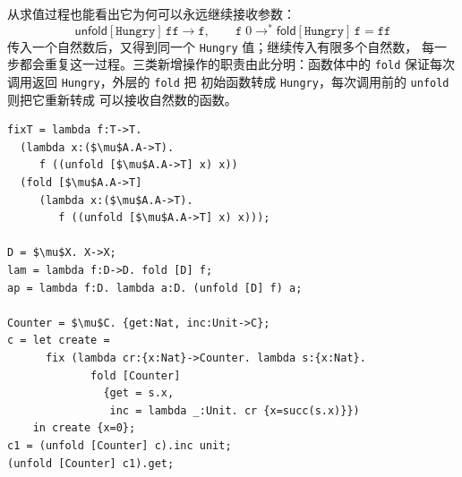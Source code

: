 \begin{taplauthorsolutionentrybox}
{从求值过程也能看出它为何可以永远继续接收参数：
\[
\mathsf{unfold}[\texttt{Hungry}]\,\texttt{ff}
\longrightarrow \texttt{f},
\qquad
\texttt{f}\;0
\longrightarrow^{*}
\mathsf{fold}[\texttt{Hungry}]\,\texttt{f}
=\texttt{ff}
\]
传入一个自然数后，又得到同一个 \texttt{Hungry} 值；继续传入有限多个自然数，
每一步都会重复这一过程。三类新增操作的职责由此分明：函数体中的
\texttt{fold} 保证每次调用返回 \texttt{Hungry}，外层的 \texttt{fold} 把
初始函数转成 \texttt{Hungry}，每次调用前的 \texttt{unfold} 则把它重新转成
可以接收自然数的函数。}

\begin{lstlisting}[mathescape=true]
fixT = lambda f:T->T.
  (lambda x:($\mu$A.A->T).
     f ((unfold [$\mu$A.A->T] x) x))
  (fold [$\mu$A.A->T]
     (lambda x:($\mu$A.A->T).
        f ((unfold [$\mu$A.A->T] x) x)));

D = $\mu$X. X->X;
lam = lambda f:D->D. fold [D] f;
ap = lambda f:D. lambda a:D. (unfold [D] f) a;

Counter = $\mu$C. {get:Nat, inc:Unit->C};
c = let create =
      fix (lambda cr:{x:Nat}->Counter. lambda s:{x:Nat}.
             fold [Counter]
               {get = s.x,
                inc = lambda _:Unit. cr {x=succ(s.x)}})
    in create {x=0};
c1 = (unfold [Counter] c).inc unit;
(unfold [Counter] c1).get;
\end{lstlisting}

\end{taplauthorsolutionentrybox}
